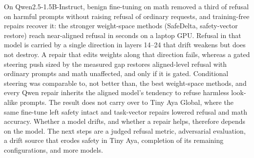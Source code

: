On Qwen2.5-1.5B-Instruct, benign fine-tuning on math removed a third of refusal on harmful prompts without raising refusal of ordinary requests, and training-free repairs recover it: the stronger weight-space methods (SafeDelta, safety-vector restore) reach near-aligned refusal in seconds on a laptop GPU. Refusal in that model is carried by a single direction in layers 14--24 that drift weakens but does not destroy. A repair that edits weights along that direction fails, whereas a gated steering push sized by the measured gap restores aligned-level refusal with ordinary prompts and math unaffected, and only if it is gated. Conditional steering was comparable to, not better than, the best weight-space methods, and every Qwen repair inherits the aligned model's tendency to refuse harmless look-alike prompts. The result does not carry over to Tiny Aya Global, where the same fine-tune left safety intact and task-vector repairs lowered refusal and math accuracy. Whether a model drifts, and whether a repair helps, therefore depends on the model. The next steps are a judged refusal metric, adversarial evaluation, a drift source that erodes safety in Tiny Aya, completion of its remaining configurations, and more models.
